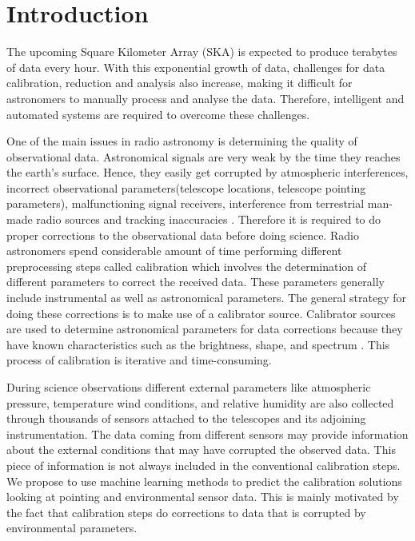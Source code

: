 \chapter{Introduction}

The upcoming Square Kilometer Array (SKA) is expected to produce terabytes of data every hour. With this exponential growth of data, challenges for data calibration, reduction and analysis also increase, making it difficult for astronomers to manually process and analyse the data. Therefore, intelligent and automated systems are required  to overcome these challenges.

One of the main issues in radio astronomy is determining the quality of observational data. Astronomical signals are very weak  by the time they reaches the earth’s surface. Hence, they easily get corrupted by  atmospheric interferences, incorrect observational parameters(telescope locations, telescope pointing parameters), malfunctioning signal receivers, interference from terrestrial man-made radio sources and tracking inaccuracies \cite{taylor1999synthesis}. Therefore it is required to do proper corrections to the observational data before doing science. Radio astronomers spend considerable amount of time performing different preprocessing steps called calibration which involves the determination of different parameters to correct the received data. These parameters generally include instrumental as well as astronomical parameters. The general strategy for doing these corrections is to make use of a calibrator source. Calibrator sources are used to determine astronomical parameters for data corrections because they have known characteristics such as the brightness, shape, and spectrum \cite{taylor1999synthesis}. This process of calibration is iterative and time-consuming.

During science observations different  external parameters like atmospheric pressure, temperature  wind conditions, and relative humidity  are also collected through thousands of sensors attached to the telescopes and its adjoining instrumentation. The data coming from different sensors may provide information about the external conditions that may have corrupted the observed data. This piece of information is not always included in the conventional calibration steps. We propose to use machine learning methods to predict the calibration solutions looking at pointing and environmental sensor data. This is mainly motivated by the fact that calibration steps do corrections to data that is corrupted by environmental parameters.

